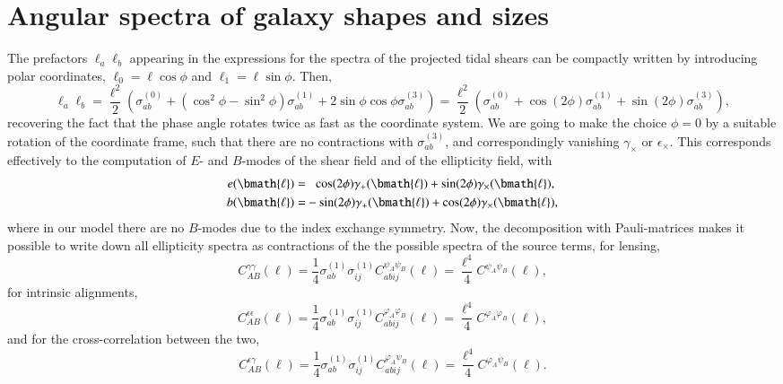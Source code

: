 \documentclass[a4paper,fleqn,usenatbib]{mnras}
\newcommand{\vecl}{\bmath{\ell}}
\begin{document}
\section{Angular spectra of galaxy shapes and sizes}\label{sect_spectra}
The prefactors $\ell_a\ell_b$ appearing in the expressions for the spectra of the projected tidal shears can be compactly written by introducing polar coordinates, $\ell_0 = \ell\cos\phi$ and $\ell_1 = \ell\sin\phi$. Then,
\begin{equation}
\ell_a\ell_b = 
\frac{\ell^2}{2}\left(\sigma^{(0)}_{ab} + (\cos^2\phi-\sin^2\phi)\sigma^{(1)}_{ab} + 2\sin\phi\cos\phi\sigma^{(3)}_{ab}\right) = 
\frac{\ell^2}{2}\left(\sigma^{(0)}_{ab} + \cos(2\phi)\sigma^{(1)}_{ab} + \sin(2\phi)\sigma^{(3)}_{ab}\right),
\end{equation}
recovering the fact that the phase angle rotates twice as fast as the coordinate system. We are going to make the choice $\phi = 0$ by a suitable rotation of the coordinate frame, such that there are no contractions with $\sigma^{(3)}_{ab}$, and correspondingly vanishing $\gamma_\times$ or $\epsilon_\times$. This corresponds effectively to the computation of $E$- and $B$-modes of the shear field and of the ellipticity field, with
\begin{align}
e(\vecl) = &\hphantom{-}\cos(2\phi)\gamma_+(\vecl) + \sin(2\phi)\gamma_\times(\vecl),\\
b(\vecl) = &-\sin(2\phi)\gamma_+(\vecl) + \cos(2\phi)\gamma_\times(\vecl),
\end{align}
where in our model there are no $B$-modes due to the index exchange symmetry. Now, the decomposition with Pauli-matrices makes it possible to write down all ellipticity spectra as contractions of the the possible spectra of the source terms, for lensing,
\begin{equation}
C^{\gamma\gamma}_{AB}(\ell) = \frac{1}{4}\sigma^{(1)}_{ab}\sigma^{(1)}_{ij}C^{\psi_A\psi_B}_{abij}(\ell) = \frac{\ell^4}{4}C^{\psi_A\psi_B}(\ell),
\end{equation}
for intrinsic alignments,
\begin{equation}
C^{\epsilon\epsilon}_{AB}(\ell) = \frac{1}{4}\sigma^{(1)}_{ab}\sigma^{(1)}_{ij}C^{\varphi_A\varphi_B}_{abij}(\ell) = \frac{\ell^4}{4}C^{\varphi_A\varphi_B}(\ell),
\end{equation}
and for the cross-correlation between the two,
\begin{equation}
C^{\epsilon\gamma}_{AB}(\ell) = \frac{1}{4}\sigma^{(1)}_{ab}\sigma^{(1)}_{ij}C^{\varphi_A\psi_B}_{abij}(\ell) = \frac{\ell^4}{4}C^{\varphi_A\psi_B}(\ell).
\end{equation}
\end{document}
